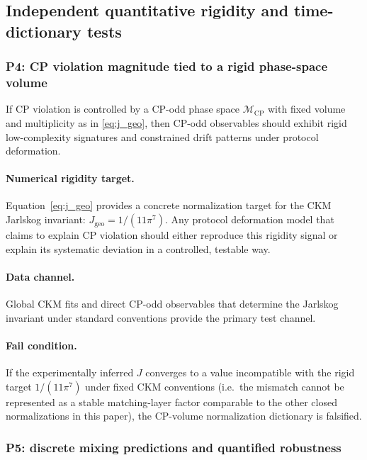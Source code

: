 \subsection{Independent quantitative rigidity and time-dictionary tests}
\label{subsec:independent_quantitative_predictions}

\subsubsection{P4: CP violation magnitude tied to a rigid phase-space volume}
\label{subsec:p4_cp_volume}

If CP violation is controlled by a CP-odd phase space $\mathcal{M}_{\mathrm{CP}}$ with fixed volume and multiplicity as in \eqref{eq:j_geo}, then CP-odd observables should exhibit rigid low-complexity signatures and constrained drift patterns under protocol deformation.
\paragraph{Numerical rigidity target.}
Equation~\eqref{eq:j_geo} provides a concrete normalization target for the CKM Jarlskog invariant: $J_{\mathrm{geo}}=1/(11\pi^7)$.
Any protocol deformation model that claims to explain CP violation should either reproduce this rigidity signal or explain its systematic deviation in a controlled, testable way.

\paragraph{Data channel.}
Global CKM fits and direct CP-odd observables that determine the Jarlskog invariant under standard conventions provide the primary test channel.

\paragraph{Fail condition.}
If the experimentally inferred $J$ converges to a value incompatible with the rigid target $1/(11\pi^7)$ under fixed CKM conventions (i.e.\ the mismatch cannot be represented as a stable matching-layer factor comparable to the other closed normalizations in this paper), the CP-volume normalization dictionary is falsified.

\subsubsection{P5: discrete mixing predictions and quantified robustness}
\label{subsec:p5_quantified_predictions}

